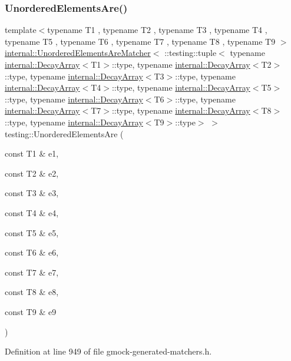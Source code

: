\subsubsection{\texorpdfstring{Unordered\+Elements\+Are()}{UnorderedElementsAre()}\hspace{0.1cm}{\footnotesize\ttfamily [10/11]}}
{\footnotesize\ttfamily template$<$typename T1 , typename T2 , typename T3 , typename T4 , typename T5 , typename T6 , typename T7 , typename T8 , typename T9 $>$ \\
\hyperlink{classtesting_1_1internal_1_1UnorderedElementsAreMatcher}{internal\+::\+Unordered\+Elements\+Are\+Matcher}$<$ \+::testing\+::tuple$<$ typename \hyperlink{structtesting_1_1internal_1_1DecayArray}{internal\+::\+Decay\+Array}$<$T1$>$\+::type, typename \hyperlink{structtesting_1_1internal_1_1DecayArray}{internal\+::\+Decay\+Array}$<$T2$>$\+::type, typename \hyperlink{structtesting_1_1internal_1_1DecayArray}{internal\+::\+Decay\+Array}$<$T3$>$\+::type, typename \hyperlink{structtesting_1_1internal_1_1DecayArray}{internal\+::\+Decay\+Array}$<$T4$>$\+::type, typename \hyperlink{structtesting_1_1internal_1_1DecayArray}{internal\+::\+Decay\+Array}$<$T5$>$\+::type, typename \hyperlink{structtesting_1_1internal_1_1DecayArray}{internal\+::\+Decay\+Array}$<$T6$>$\+::type, typename \hyperlink{structtesting_1_1internal_1_1DecayArray}{internal\+::\+Decay\+Array}$<$T7$>$\+::type, typename \hyperlink{structtesting_1_1internal_1_1DecayArray}{internal\+::\+Decay\+Array}$<$T8$>$\+::type, typename \hyperlink{structtesting_1_1internal_1_1DecayArray}{internal\+::\+Decay\+Array}$<$T9$>$\+::type$>$ $>$ testing\+::\+Unordered\+Elements\+Are (\begin{DoxyParamCaption}\item[{const T1 \&}]{e1,  }\item[{const T2 \&}]{e2,  }\item[{const T3 \&}]{e3,  }\item[{const T4 \&}]{e4,  }\item[{const T5 \&}]{e5,  }\item[{const T6 \&}]{e6,  }\item[{const T7 \&}]{e7,  }\item[{const T8 \&}]{e8,  }\item[{const T9 \&}]{e9 }\end{DoxyParamCaption})\hspace{0.3cm}{\ttfamily [inline]}}



Definition at line 949 of file gmock-\/generated-\/matchers.\+h.



